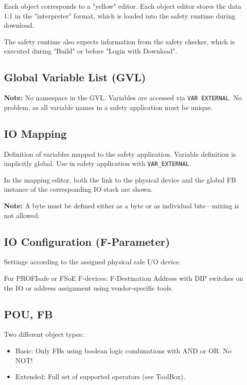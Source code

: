 \documentclass[a4paper,12pt]{article}
\begin{document}
Each object corresponds to a "yellow" editor. Each object editor stores the data 1:1 in the "interpreter" format, which is loaded into the safety runtime during download.

The safety runtime also expects information from the safety checker, which is executed during "Build" or before "Login with Download".

\subsection{Global Variable List (GVL)}

\textbf{Note:} No namespace in the GVL. Variables are accessed via \texttt{VAR EXTERNAL}. No problem, as all variable names in a safety application must be unique.

\subsection{IO Mapping}

Definition of variables mapped to the safety application. Variable definition is implicitly global. Use in safety application with \texttt{VAR\_EXTERNAL}.

In the mapping editor, both the link to the physical device and the global FB instance of the corresponding IO stack are shown.

\textbf{Note:} A byte must be defined either as a byte or as individual bits—mixing is not allowed.

\subsection{IO Configuration (F-Parameter)}

Settings according to the assigned physical safe I/O device.

For PROFIsafe or FSoE F-devices: F-Destination Address with DIP switches on the IO or address assignment using vendor-specific tools.

\subsection{POU, FB}

Two different object types:
\begin{itemize}
	\item Basic: Only FBs using boolean logic combinations with AND or OR. No NOT!
	\item Extended: Full set of supported operators (see ToolBox).
\end{itemize}
\end{document}
